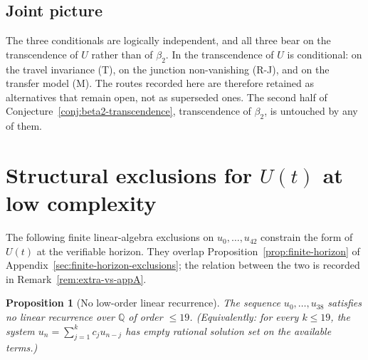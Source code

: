 \documentclass[11pt]{article}
\theoremstyle{plain}
\newtheorem{proposition}[theorem]{Proposition}
\theoremstyle{definition}
\theoremstyle{remark}
\begin{document}
\subsection{Joint picture}

The three conditionals are logically independent, and all three bear on
the transcendence of $U$ rather than of $\beta_2$. In
\cite{Bonfioli2026b} the transcendence of $U$ is conditional: on the travel
invariance (T), on the junction non-vanishing (R-J), and on the transfer
model (M). The routes recorded here are therefore retained as alternatives
that remain open, not as superseded ones. The second
half of Conjecture~\ref{conj:beta2-transcendence}, transcendence of
$\beta_2$, is untouched by any of them.

\section{Structural exclusions for \texorpdfstring{$U(t)$}{U(t)} at low
complexity}
\label{sec:structural-negatives}

The following finite linear-algebra exclusions on $u_0, \ldots, u_{42}$
constrain the form of $U(t)$ at the verifiable horizon. They overlap
Proposition~\ref{prop:finite-horizon} of
Appendix~\ref{sec:finite-horizon-exclusions}; the relation between the two is
recorded in Remark~\ref{rem:extra-vs-appA}.

\begin{proposition}[No low-order linear recurrence]
\label{prop:no-recurrence}
The sequence $u_0, \ldots, u_{38}$ satisfies no linear recurrence over
$\mathbb{Q}$ of order $\le 19$.  (Equivalently: for every $k \le 19$,
the system $u_n = \sum_{j=1}^k c_j u_{n-j}$ has empty rational solution
set on the available terms.)
\end{proposition}
\end{document}
